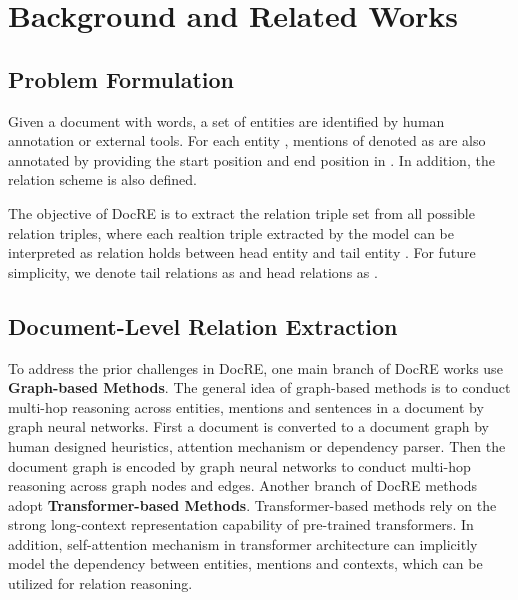 \documentclass[11pt]{article}
\begin{document}
\section{Background and Related Works}
\subsection{Problem Formulation}
Given a document  with  words, a set of  entities  are identified by human annotation or external tools. For each entity ,  mentions of  denoted as  are also annotated by providing the start position and end position in . In addition, the relation scheme  is also defined.

The objective of DocRE is to extract the relation triple set  from all possible relation triples, where each realtion triple  extracted by the model can be interpreted as relation  holds between head entity  and tail entity . For future simplicity, we denote tail relations as  and head relations as .
\subsection{Document-Level Relation Extraction}
\label{sec:docre-background}


To address the prior challenges in DocRE, one main branch of DocRE works use \textbf{Graph-based Methods}\citep{sahu_inter-sentence_2019,christopoulou_connecting_2019,wang_global--local_2020,zeng_double_2020,nan_reasoning_2020,li_graph_2020,xu_discriminative_2021}. The general idea of graph-based methods is to conduct multi-hop reasoning across entities, mentions and sentences in a document by graph neural networks. First a document is converted to a document graph by human designed heuristics, attention mechanism or dependency parser. Then the document graph is encoded by graph neural networks\cite{DBLP:conf/iclr/KipfW17,NEURIPS2018_182be0c5,wu2021graph} to conduct multi-hop reasoning across graph nodes and edges. Another branch of DocRE methods adopt \textbf{Transformer-based Methods}\citep{wang_fine-tune_2019,ye_coreferential_2020, DBLP:conf/aaai/XuWLZM21, zhou_atlop_2021, zhang_docunet_2021}. Transformer-based methods rely on the strong long-context representation capability of pre-trained transformers\citep{devlin-etal-2019-bert,liu_roberta_2019}. In addition, self-attention mechanism in transformer architecture can implicitly model the dependency between entities, mentions and contexts, which can be utilized for relation reasoning\citep{zhou_atlop_2021}. 
\end{document}

